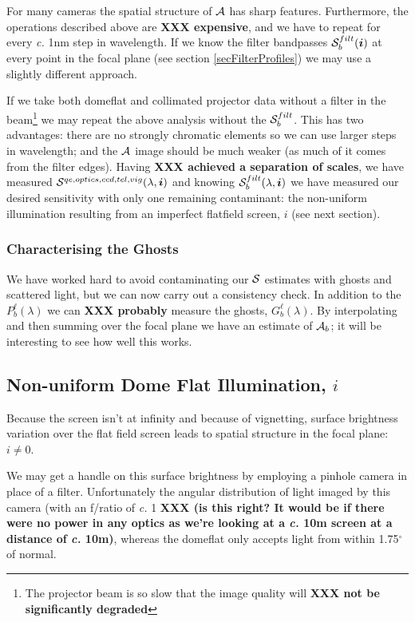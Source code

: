 \documentclass[12pt]{article}
\renewcommand{\c}{\textit{c.}\xspace}
\newcommand{\ib}{{\boldsymbol i}}
\newcommand{\additive}{{\cal A}}
\newcommand{\qe}{{\cal S}}
\newcommand{\XXX}[1]{\textbf{XXX #1}\xspace}
\begin{document}
For many cameras the spatial structure of $\additive$ has sharp features.  Furthermore, the operations
described above are \XXX{expensive}, and we have to repeat for every \c 1nm step in wavelength.  If we know
the filter bandpasses $\qe_b^{filt}(\ib)$ at every point in the focal plane (see section
\ref{secFilterProfiles}) we may use a slightly different approach.

If we take both domeflat and collimated projector data without a filter in the beam\footnote{
  The projector beam is so slow that the
  image quality will \XXX{not be significantly degraded}} we may repeat
the above analysis without the $\qe_b^{filt}$.  This has two advantages: there are
no strongly chromatic elements so we can use larger steps in wavelength;  and the $\additive$
image should be much weaker (as much of it comes from the filter edges).  Having \XXX{achieved a
separation of scales}, we have measured
$\qe^{qe, optics, ccd, tel, vig}(\lambda, \ib)$ and knowing $\qe_b^{filt}(\lambda, \ib)$ we have
measured our desired sensitivity with only one remaining contaminant: the non-uniform illumination
resulting from an imperfect flatfield screen, $i$ (see next section).

\subsubsection{Characterising the Ghosts}

We have worked hard to avoid contaminating our $\qe$ estimates with ghosts and scattered light, but
we can now carry out a consistency check.  In addition to the $P_b^\ell(\lambda)$ we can \XXX{probably}
measure the ghosts, $G_b^\ell(\lambda)$.  By interpolating and then summing over the focal plane
we have an estimate of $\additive_b$;  it will be interesting to see how well this works.

\subsection{Non-uniform Dome Flat Illumination, \texorpdfstring{$i$}{i}}

Because the screen isn't at infinity and because of vignetting, surface brightness variation over
the flat field screen leads to spatial structure in the focal plane: $i \ne 0$.

We may get a handle on this surface brightness by employing a pinhole camera in place of a
filter. Unfortunately the angular distribution of light imaged by this camera (with an f/ratio of
\c 1 \XXX{(is this right?  It would be if there were no power in any optics as we're looking at
  a \c 10m screen at a distance of \c 10m)}, whereas the domeflat only accepts light from within
1.75$^\circ$ of normal.
\end{document}
